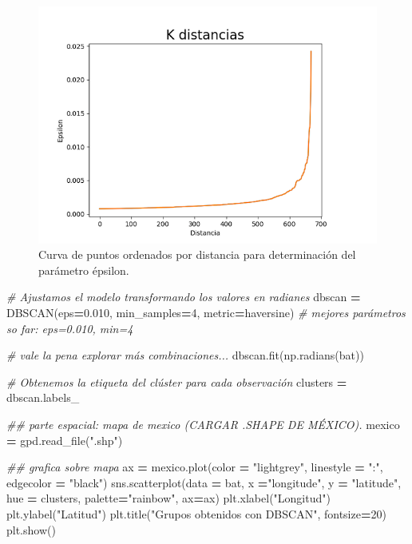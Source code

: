 \documentclass[
]{article}
\newenvironment{Shaded}{\begin{snugshade}}{\end{snugshade}}
\newcommand{\CommentTok}[1]{\textcolor[rgb]{0.56,0.35,0.01}{\textit{#1}}}
\newcommand{\DecValTok}[1]{\textcolor[rgb]{0.00,0.00,0.81}{#1}}
\newcommand{\FloatTok}[1]{\textcolor[rgb]{0.00,0.00,0.81}{#1}}
\newcommand{\NormalTok}[1]{#1}
\newcommand{\OperatorTok}[1]{\textcolor[rgb]{0.81,0.36,0.00}{\textbf{#1}}}
\newcommand{\StringTok}[1]{\textcolor[rgb]{0.31,0.60,0.02}{#1}}
\begin{document}
\begin{figure}
\centering
\includegraphics{./KMEANS.png}
\caption{Curva de puntos ordenados por distancia para determinación del
parámetro épsilon.}
\end{figure}

\begin{Shaded}
\begin{Highlighting}[]
\CommentTok{\# Ajustamos el modelo transformando los valores en radianes}
\NormalTok{dbscan }\OperatorTok{=}\NormalTok{ DBSCAN(eps}\OperatorTok{=}\FloatTok{0.010}\NormalTok{, min\_samples}\OperatorTok{=}\DecValTok{4}\NormalTok{, metric}\OperatorTok{=}\StringTok{\textquotesingle{}haversine\textquotesingle{}}\NormalTok{) }\CommentTok{\# mejores parámetros so far: eps=0.010, min=4}

\CommentTok{\# vale la pena explorar más combinaciones...}
\NormalTok{dbscan.fit(np.radians(bat))}

\CommentTok{\# Obtenemos la etiqueta del clúster para cada observación}
\NormalTok{clusters }\OperatorTok{=}\NormalTok{ dbscan.labels\_}

\CommentTok{\#\# parte espacial: mapa de mexico (CARGAR .SHAPE DE MÉXICO). }
\NormalTok{mexico }\OperatorTok{=}\NormalTok{ gpd.read\_file(}\StringTok{".shp"}\NormalTok{)}

\CommentTok{\#\# grafica sobre mapa}
\NormalTok{ax }\OperatorTok{=}\NormalTok{ mexico.plot(color }\OperatorTok{=} \StringTok{"lightgrey"}\NormalTok{, linestyle }\OperatorTok{=} \StringTok{":"}\NormalTok{, edgecolor }\OperatorTok{=} \StringTok{"black"}\NormalTok{)}
\NormalTok{sns.scatterplot(data }\OperatorTok{=}\NormalTok{ bat, x }\OperatorTok{=}\StringTok{"longitude"}\NormalTok{, y }\OperatorTok{=} \StringTok{"latitude"}\NormalTok{, hue }\OperatorTok{=}\NormalTok{ clusters,  palette}\OperatorTok{=}\StringTok{"rainbow"}\NormalTok{, ax}\OperatorTok{=}\NormalTok{ax)}
\NormalTok{plt.xlabel(}\StringTok{"Longitud"}\NormalTok{)}
\NormalTok{plt.ylabel(}\StringTok{"Latitud"}\NormalTok{)}
\NormalTok{plt.title(}\StringTok{"Grupos obtenidos con DBSCAN"}\NormalTok{, fontsize}\OperatorTok{=}\DecValTok{20}\NormalTok{)}
\NormalTok{plt.show()}
\end{Highlighting}
\end{Shaded}
\end{document}
